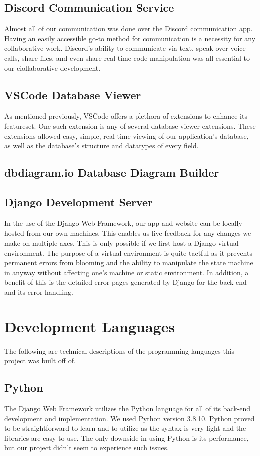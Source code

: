 \documentclass[sigconf]{acmart}
\begin{document}
\subsection{Discord Communication Service}
Almost all of our communication was done over the Discord communication app. Having an easily accessible go-to method for communication is a necessity for any collaborative work. Discord's ability to communicate via text, speak over voice calls, share files, and even share real-time code manipulation was all essential to our ciollaborative development.

\subsection{VSCode Database Viewer}
As mentioned previously, VSCode offers a plethora of extensions to enhance its featureset. One such extension is any of several database viewer extensions. These extensions allowed easy, simple, real-time viewing of our application's database, as well as the database's structure and datatypes of every field.

\subsection{dbdiagram.io Database Diagram Builder}

\subsection{Django Development Server}
In the use of the Django Web Framework, our app and website can be locally hosted from our own machines. This enables us live feedback for any changes we make on multiple axes. This is only possible if we first host a Django virtual environment. The purpose of a virtual environment is quite tactful as it prevents permanent errors from blooming and the ability to manipulate the state machine in anyway without affecting one's machine or static environment. In addition, a benefit of this is the detailed error pages generated by Django for the back-end and its error-handling.

\section{Development Languages}
The following are technical descriptions of the programming languages this project was built off of.

\subsection{Python}
The Django Web Framework utilizes the Python language for all of its back-end development and implementation. We used Python version 3.8.10. Python proved to be straightforward to learn and to utilize as the syntax is very light and the libraries are easy to use. The only downside in using Python is its performance, but our project didn't seem to experience such issues.
\end{document}
